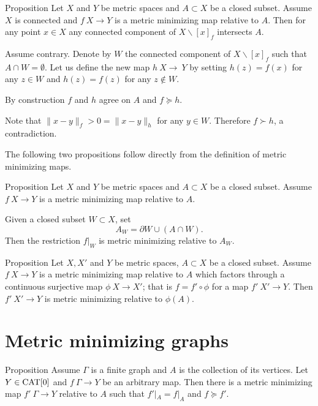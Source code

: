 \documentclass[a4paper,10pt]{amsart}
\begin{document}
\begin{thm}{Proposition}\label{prop:point-complement}
Let $X$ and $Y$ be metric spaces 
and $A\subset X$ be a closed subset.
Assume $X$ is connected and $f\:X\to Y$ is a metric minimizing map relative to $A$.
Then for any point $x\in X$ any connected component of $X\backslash [x]_f$ intersects $A$.

\end{thm}

Assume contrary.
Denote by $W$ the connected component of $X\backslash [x]_f$ such that $A\cap W=\emptyset$.
Let us define the new map $h\:X\to\ Y$ 
by setting $h(z)=f(x)$ for any $z\in W$
and $h(z)=f(z)$ for any $z\notin W$.

By construction $f$ and $h$ agree on $A$ and $f\succcurlyeq h$.

Note that $\|x-y\|_f>0=\|x-y\|_h$ for any $y\in W$.
Therefore $f\succ h$, a contradiction.
\qeds

The following two propositions follow directly from the definition of metric minimizing maps.

\begin{thm}{Proposition}\label{prop:subset}
Let $X$ and $Y$ be metric spaces and $A\subset X$ be a closed subset.
Assume $f\:X\to Y$ is a metric minimizing map relative to $A$.

Given a closed subset $W\subset X$, set 
\[A_W=\partial W\cup (A\cap W).\]
Then the restriction $f|_W$ is metric minimizing relative to $A_W$.
\end{thm}

\begin{thm}{Proposition}\label{prop:factor}
Let $X, X'$ and $Y$ be metric spaces, 
$A\subset X$ be a closed subset.
Assume $f\:X\to Y$ is a metric minimizing map relative to $A$
which factors through a continuous surjective map $\phi\:X\to X'$;
that is $f=f'\circ\phi$ for a map $f'\:X'\to Y$.
Then $f'\:X'\to Y$ is metric minimizing relative to $\phi(A)$.
\end{thm}

\section{Metric minimizing graphs}



\begin{thm}{Proposition}
Assume $\Gamma$ is a  finite graph and $A$ is the collection of its vertices.
Let $Y\in\mathop{\rm CAT}\nolimits[0]$ and $f\:\Gamma\to Y$ be an arbitrary map.
Then there is a metric minimizing map $f'\:\Gamma\to Y$ relative to $A$ such that
$f'|_A=f|_A$ and 
$f\succcurlyeq f'$.
\end{thm} 
\end{document}
